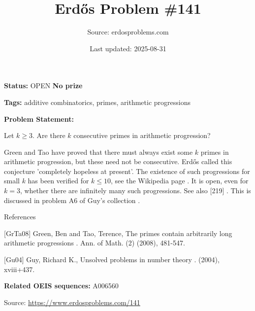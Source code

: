 \documentclass{article}
\title{Erd\H{o}s Problem \#141}
\date{Last updated: 2025-08-31}
\author{Source: erdosproblems.com}
\begin{document}
\maketitle

\noindent\textbf{Status:} OPEN \quad \textbf{No prize}

\noindent\textbf{Tags:} additive combinatorics, primes, arithmetic progressions

\medskip

\noindent\textbf{Problem Statement:}

Let $k\geq 3$. Are there $k$ consecutive primes in arithmetic progression?




Green and Tao \cite{GrTa08} have proved that there must always exist some $k$ primes in arithmetic progression, but these need not be consecutive. Erd\H{o}s called this conjecture 'completely hopeless at present'. The existence of such progressions for small $k$ has been verified for $k\leq 10$, see the Wikipedia page . It is open, even for $k=3$, whether there are infinitely many such progressions. See also [219] . This is discussed in problem A6 of Guy's collection \cite{Gu04}.




References

[GrTa08] Green, Ben and Tao, Terence, The primes contain arbitrarily long arithmetic progressions . Ann. of Math. (2) (2008), 481-547.

[Gu04] Guy, Richard K., Unsolved problems in number theory . (2004), xviii+437.

\noindent\textbf{Related OEIS sequences:} A006560


\bigskip
\noindent\small{Source: \url{https://www.erdosproblems.com/141}}
\end{document}

